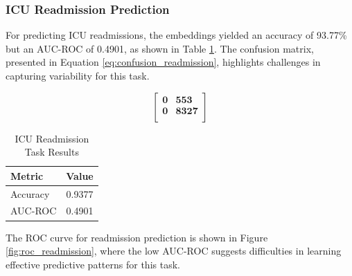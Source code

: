 \documentclass[twocolumn]{article}
\begin{document}
    \subsubsection{ICU Readmission Prediction}

    For predicting ICU readmissions, the embeddings yielded an accuracy of 93.77\%
    but an AUC-ROC of 0.4901, as shown in Table \ref{tab:readmission_results}. The
    confusion matrix, presented in Equation \ref{eq:confusion_readmission}, highlights
    challenges in capturing variability for this task.

    \[
        \begin{bmatrix}
            \textbf{0} & \textbf{553}  \\
            \textbf{0} & \textbf{8327} \\
        \end{bmatrix}
        \label{eq:confusion_readmission}
    \]

    \begin{table}[h]
        \centering
        \begin{tabular}{|l|c|}
            \hline
            \textbf{Metric} & \textbf{Value} \\
            \hline
            Accuracy        & 0.9377         \\
            AUC-ROC         & 0.4901         \\
            \hline
        \end{tabular}
        \caption{ICU Readmission Task Results}
        \label{tab:readmission_results}
    \end{table}

    The ROC curve for readmission prediction is shown in Figure \ref{fig:roc_readmission},
    where the low AUC-ROC suggests difficulties in learning effective predictive
    patterns for this task.
\end{document}
